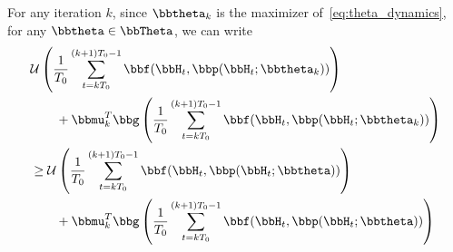 



For any iteration $k$, since $\bbtheta_k$ is the maximizer of~\eqref{eq:theta_dynamics}, for any $\bbtheta\in\bbTheta$, we can write
\begin{align}
& \mathcal{U}\left( \frac{1}{T_0} \sum_{t=kT_0}^{(k+1)T_0-1} \bbf(\bbH_{t}, \bbp(\bbH_{t};\bbtheta_k)) \right)\nonumber \\
   &\qquad+ \bbmu_{k}^T \bbg\left( \frac{1}{T_0} \sum_{t=kT_0}^{(k+1)T_0-1} \bbf(\bbH_{t}, \bbp(\bbH_{t};\bbtheta_k)) \right)\nonumber   \\
& \geq \mathcal{U}\left( \frac{1}{T_0} \sum_{t=kT_0}^{(k+1)T_0-1} \bbf(\bbH_{t}, \bbp(\bbH_{t};\bbtheta)) \right)\nonumber \\
   &\qquad+ \bbmu_{k}^T \bbg\left( \frac{1}{T_0} \sum_{t=kT_0}^{(k+1)T_0-1} \bbf(\bbH_{t}, \bbp(\bbH_{t};\bbtheta)) \right)\nonumber 
\end{align}

